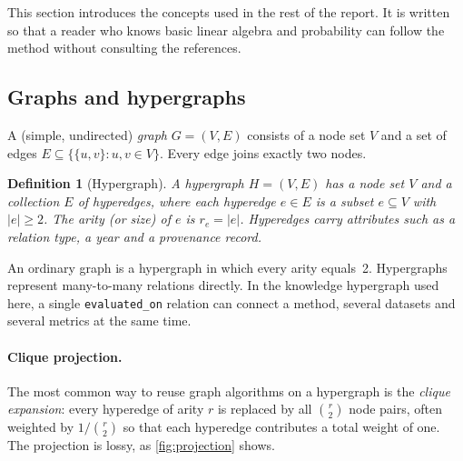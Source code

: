 \documentclass[11pt,a4paper]{article}
\newcommand{\cref}[1]{\autoref{#1}}
\newtheorem{definition}{Definition}[section]
\theoremstyle{remark}
\newcommand{\code}[1]{\texttt{\small #1}}
\begin{document}
This section introduces the concepts used in the rest of the report. It is written
so that a reader who knows basic linear algebra and probability can follow the
method without consulting the references.

\subsection{Graphs and hypergraphs}

A (simple, undirected) \emph{graph} $G=(V,E)$ consists of a node set $V$ and a set
of edges $E\subseteq\{\{u,v\}:u,v\in V\}$. Every edge joins exactly two nodes.

\begin{definition}[Hypergraph]
A \emph{hypergraph} $H=(V,E)$ has a node set $V$ and a collection $E$ of
\emph{hyperedges}, where each hyperedge $e\in E$ is a subset $e\subseteq V$ with
$|e|\ge 2$. The \emph{arity} (or size) of $e$ is $r_e=|e|$. Hyperedges carry
attributes such as a relation type, a year and a provenance record.
\end{definition}

An ordinary graph is a hypergraph in which every arity equals~2. Hypergraphs
represent many-to-many relations directly. In the knowledge hypergraph used here, a
single \code{evaluated\_on} relation can connect a method, several datasets and
several metrics at the same time.

\paragraph{Clique projection.}
The most common way to reuse graph algorithms on a hypergraph is the \emph{clique
expansion}: every hyperedge of arity $r$ is replaced by all $\binom{r}{2}$ node
pairs, often weighted by $1/\binom{r}{2}$ so that each hyperedge contributes a total
weight of one. The projection is lossy, as \cref{fig:projection} shows.
\end{document}
